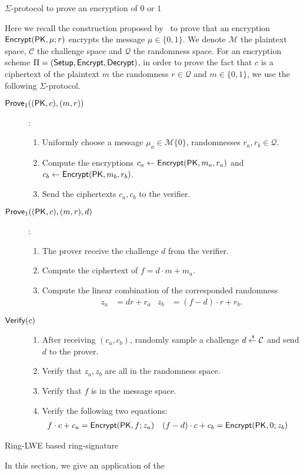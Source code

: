 \begin{section}{$\Sigma$-protocol to prove an encryption of $0$ or $1$~\cite{DBLP:conf/pkc/ChaidosG15}~\label{sigma}}

  Here we recall the construction proposed by~\cite{DBLP:conf/pkc/ChaidosG15} to prove that an encryption ${\mathsf{Encrypt}}(\mathsf{PK},\mu; r)$ encrypts the message $\mu \in \{0,1\}$.
  We denote $\mathcal{M}$ the plaintext space, $\mathcal{C}$ the challenge space and $\mathcal{Q}$ the randomness space.
  For an encryption scheme $\Pi = ({\mathsf{Setup}}, {\mathsf{Encrypt}}, {\mathsf{Decrypt}})$,
  in order to prove the fact that $c$ is a ciphertext of the plaintext $m$ \wrt the randomness $r \in \mathcal{Q}$ and $m \in \{0,1\}$,
  we use the following $\Sigma$-protocol.

  \begin{description}
    \item[${\mathsf{Prove}}_1((\mathsf{PK}, c), (m, r))$]:
    \begin{enumerate}
      \item Uniformly choose a message $\mu_a \in \mathcal{M} \{0\}$, randomnesses $r_a, r_b \in \mathcal{Q}$.
      \item Compute the encryptions $c_a \gets {\mathsf{Encrypt}}(\mathsf{PK}, m_a, r_a)$ and $c_b \gets {\mathsf{Encrypt}}(\mathsf{PK}, m_b, r_b)$.
      \item Send the ciphertexts $c_a, c_b$ to the verifier.
    \end{enumerate}
    \item[${\mathsf{Prove}}_1((\mathsf{PK}, c), (m, r), d)$]:
    \begin{enumerate}
      \item The prover receive the challenge $d$ from the verifier.
      \item Compute the ciphertext of $f = d \cdot m + m_a$.
      \item Compute the linear combination of the corresponded randomness
      \begin{align*}
        z_a &= d r + r_a  & z_b &= (f-d) \cdot r + r_b.
      \end{align*}
    \end{enumerate}
  \item[${\mathsf{Verify}}(c)$]
    \begin{enumerate}
    \item After receiving $(c_a, c_b)$, randomly sample a challenge $ d \stackrel{{\scriptscriptstyle \mkern4mu \$}}{\gets} \mathcal{C}$ and send $d$ to the prover.
    \item Verify that $z_a, z_b$ are all in the randomness space.
    \item Verify that $f$ is in the message space.
    \item Verify the following two equations:
      \begin{align*}
        f \cdot c + c_a &= {\mathsf{Encrypt}}(\mathsf{PK}, f; z_a) &  (f-d) \cdot c + c_b &= {\mathsf{Encrypt}}(\mathsf{PK}, 0; z_b)
      \end{align*}
    \end{enumerate}
  \end{description}



\end{section}


\begin{section}{Ring-LWE based ring-signature}

  In this section, we give an application of the


\end{section}
